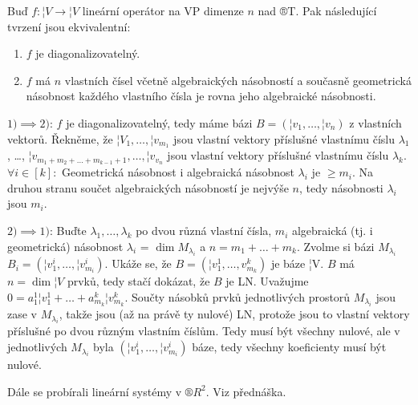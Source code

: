 \documentclass[12pt]{article}                   %
\begin{document}
        \begin{veta}
            Buď $f: ¦V \rightarrow ¦V$ lineární operátor na VP dimenze $n$ nad ®T. Pak následující tvrzení jsou ekvivalentní:

            \begin{enumerate}
                \item $f$ je diagonalizovatelný.
                \item $f$ má $n$ vlastních čísel včetně algebraických násobností a současně geometrická násobnost každého vlastního čísla je rovna jeho algebraické násobnosti.
            \end{enumerate}
            
            \begin{dukazin}
                $1) \implies 2)$: $f$ je diagonalizovatelný, tedy máme bázi $B = (¦v_1, …, ¦v_n)$ z vlastních vektorů. Řekněme, že $¦V_1, …, ¦v_{m_1}$ jsou vlastní vektory příslušné vlastnímu číslu $\lambda_1$, …, $¦v_{m_1 + m_2 + … + m_{k-1} + 1}, …, ¦v_{v_n}$ jsou vlastní vektory příslušné vlastnímu číslu $\lambda_k$. $\forall i \in [k]:$ Geometrická násobnost i algebraická násobnost $\lambda_i$ je $≥ m_i$. Na druhou stranu součet algebraických násobností je nejvýše $n$, tedy násobnosti $\lambda_i$ jsou $m_i$.

                $2) \implies 1)$: Buďte $\lambda_1, …, \lambda_k$ po dvou různá vlastní čísla, $m_i$ algebraická (tj. i geometrická) násobnost $\lambda_i$ = $\dim M_{\lambda_i}$ a $n = m_1 + … + m_k$. Zvolme si bázi $M_{\lambda_i}$ $B_i = (¦v_1^i, …, ¦v_{m_i}^i)$. Ukáže se, že $B = (¦v_1^1, …, v_{m_k}^k)$ je báze ¦V. $B$ má $n = \dim ¦V$ prvků, tedy stačí dokázat, že $B$ je LN. Uvažujme $0 = a_1^1¦v_1^1 + … + a_{m_k}^k¦v_{m_k}^k$. Součty násobků prvků jednotlivých prostorů $M_{\lambda_i}$ jsou zase v $M_{\lambda_i}$, takže jsou (až na právě ty nulové) LN, protože jsou to vlastní vektory příslušné po dvou různým vlastním číslům. Tedy musí být všechny nulové, ale v jednotlivých $M_{\lambda_i}$ byla $(¦v_1^i, …, ¦v_{m_i}^i)$ báze, tedy všechny koeficienty musí být nulové. 
            \end{dukazin}
        \end{veta}


        \begin{poznamka}
            Dále se probírali lineární systémy v $®R^2$. Viz přednáška.
        \end{poznamka}

\end{document}
